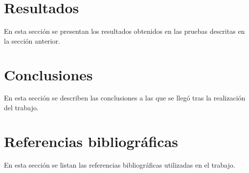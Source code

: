 \documentclass[12pt]{article}
\begin{document}
\section{Resultados}
En esta sección se presentan los resultados obtenidos en las pruebas descritas en la sección anterior.

\section{Conclusiones}
En esta sección se describen las conclusiones a las que se llegó tras la realización del trabajo.

\section{Referencias bibliográficas}
En esta sección se listan las referencias bibliográficas utilizadas en el trabajo.
\end{document}
